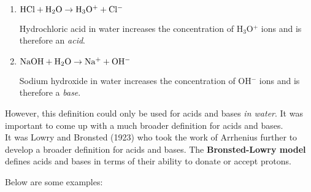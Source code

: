 \begin{enumerate}
\item{
$\rm{HCl + H_{2}O \rightarrow H_{3}O^{+} + Cl^{-}}$

Hydrochloric acid in water increases the concentration of H$_{3}$O$^{+}$ ions and is therefore an \textit{acid}.}

\item{$\rm{NaOH + H_{2}O \rightarrow Na^{+} + OH^{-}}$

Sodium hydroxide in water increases the concentration of OH$^{-}$ ions and is therefore a \textit{base}.}
\end{enumerate}

However, this definition could only be used for acids and bases \textit{in water}. It was important to come up with a much broader definition for acids and bases. \\

It was Lowry and Bronsted (1923) who took the work of Arrhenius further to develop a broader definition for acids and bases. The \textbf{Bronsted-Lowry model} defines acids and bases in terms of their ability to donate or accept protons.


Below are some examples:

